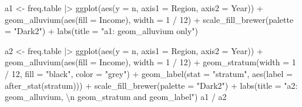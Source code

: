\documentclass[
  letterpaper,
  DIV=11,
  numbers=noendperiod]{scrreprt}
\newenvironment{Shaded}{\begin{snugshade}}{\end{snugshade}}
\newcommand{\AttributeTok}[1]{\textcolor[rgb]{0.40,0.45,0.13}{#1}}
\newcommand{\DecValTok}[1]{\textcolor[rgb]{0.68,0.00,0.00}{#1}}
\newcommand{\FunctionTok}[1]{\textcolor[rgb]{0.28,0.35,0.67}{#1}}
\newcommand{\NormalTok}[1]{\textcolor[rgb]{0.00,0.23,0.31}{#1}}
\newcommand{\OtherTok}[1]{\textcolor[rgb]{0.00,0.23,0.31}{#1}}
\newcommand{\SpecialCharTok}[1]{\textcolor[rgb]{0.37,0.37,0.37}{#1}}
\newcommand{\StringTok}[1]{\textcolor[rgb]{0.13,0.47,0.30}{#1}}
\begin{document}
\begin{Shaded}
\begin{Highlighting}[]
\NormalTok{a1 }\OtherTok{\textless{}{-}}\NormalTok{ freq.table }\SpecialCharTok{|\textgreater{}}
  \FunctionTok{ggplot}\NormalTok{(}\FunctionTok{aes}\NormalTok{(}\AttributeTok{y =}\NormalTok{ n, }\AttributeTok{axis1 =}\NormalTok{ Region, }\AttributeTok{axis2 =}\NormalTok{ Year)) }\SpecialCharTok{+}
  \FunctionTok{geom\_alluvium}\NormalTok{(}\FunctionTok{aes}\NormalTok{(}\AttributeTok{fill =}\NormalTok{ Income), }\AttributeTok{width =} \DecValTok{1} \SpecialCharTok{/} \DecValTok{12}\NormalTok{) }\SpecialCharTok{+}
  \FunctionTok{scale\_fill\_brewer}\NormalTok{(}\AttributeTok{palette =} \StringTok{"Dark2"}\NormalTok{) }\SpecialCharTok{+}
  \FunctionTok{labs}\NormalTok{(}\AttributeTok{title =} \StringTok{"a1: geom\_alluvium only"}\NormalTok{)}

\NormalTok{a2 }\OtherTok{\textless{}{-}}\NormalTok{ freq.table }\SpecialCharTok{|\textgreater{}}
  \FunctionTok{ggplot}\NormalTok{(}\FunctionTok{aes}\NormalTok{(}\AttributeTok{y =}\NormalTok{ n, }\AttributeTok{axis1 =}\NormalTok{ Region, }\AttributeTok{axis2 =}\NormalTok{ Year)) }\SpecialCharTok{+}
  \FunctionTok{geom\_alluvium}\NormalTok{(}\FunctionTok{aes}\NormalTok{(}\AttributeTok{fill =}\NormalTok{ Income), }\AttributeTok{width =} \DecValTok{1} \SpecialCharTok{/} \DecValTok{12}\NormalTok{) }\SpecialCharTok{+}
  \FunctionTok{geom\_stratum}\NormalTok{(}\AttributeTok{width =} \DecValTok{1} \SpecialCharTok{/} \DecValTok{12}\NormalTok{, }\AttributeTok{fill =} \StringTok{"black"}\NormalTok{, }\AttributeTok{color =} \StringTok{"grey"}\NormalTok{) }\SpecialCharTok{+}
  \FunctionTok{geom\_label}\NormalTok{(}\AttributeTok{stat =} \StringTok{"stratum"}\NormalTok{, }\FunctionTok{aes}\NormalTok{(}\AttributeTok{label =} \FunctionTok{after\_stat}\NormalTok{(stratum))) }\SpecialCharTok{+} \FunctionTok{scale\_fill\_brewer}\NormalTok{(}\AttributeTok{palette =} \StringTok{"Dark2"}\NormalTok{) }\SpecialCharTok{+}
  \FunctionTok{labs}\NormalTok{(}\AttributeTok{title =} \StringTok{"a2: geom\_alluvium, }\SpecialCharTok{\textbackslash{}n}\StringTok{ geom\_stratum and geom\_label"}\NormalTok{)}
\NormalTok{a1 }\SpecialCharTok{/}\NormalTok{ a2}
\end{Highlighting}
\end{Shaded}
\end{document}
